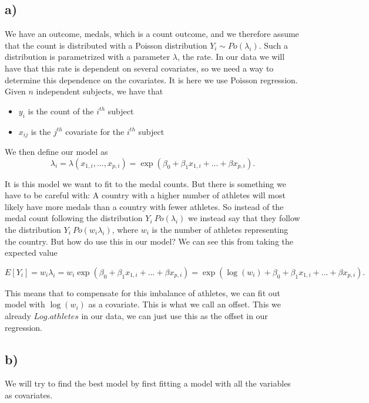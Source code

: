 \documentclass[a4paper,norsk, 10pt]{article}
\begin{document}
\subsection{a)}
We have an outcome, medals, which is a count outcome, and we therefore assume that the count is distributed with a Poisson distribution $Y_i \sim Po(\lambda_i)$. Such a distribution is parametrized with a parameter $\lambda$, the rate. In our data we will have that this rate is dependent on several covariates, so we need a way to determine this dependence on the covariates. It is here we use Poisson regression. Given $n$ independent subjects, we have that 
\begin{itemize}
\item $y_i$ is the count of the $i^{th}$ subject
\item $x_{ij}$ is the $j^{th}$ covariate for the $i^{th}$ subject
\end{itemize}
We then define our model as 
\begin{equation}
\lambda_i = \lambda(x_{1,i},...,x_{p,i}) = \exp(\beta_0 + \beta_1 x_{1,i} + ... + \beta x_{p,i}).
\end{equation}

It is this model we want to fit to the medal counts. But there is something we have to be careful with: A country with a higher number of athletes will most likely have more medals than a country with fewer athletes. So instead of the medal count following the distribution $Y_i ~ Po(\lambda_i)$ we instead say that they follow the distribution $Y_i ~ Po(w_i\lambda_i)$, where $w_i$ is the number of athletes representing the country. But how do use this in our model? We can see this from taking the expected value

\begin{equation}
E[Y_i] = w_i \lambda_i = w_i\exp(\beta_0 + \beta_1 x_{1,i} + ... + \beta x_{p,i}) = \exp(\log(w_i) + \beta_0 + \beta_1 x_{1,i} + ... + \beta x_{p,i}).
\end{equation}

This means that to compensate for this imbalance of athletes, we can fit out model with $\log(w_i)$ as a covariate. This is what we call an offset. This we already $Log.athletes$ in our data, we can just use this as the offset in our regression.

\subsection{b)}
We will try to find the best model by first fitting a model with all the variables as covariates. 
\end{document}
